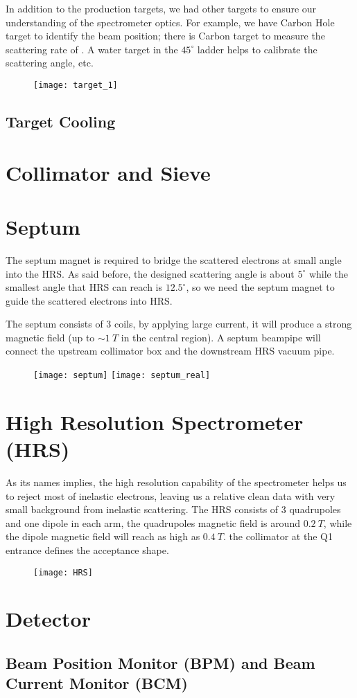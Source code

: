In addition to the production targets, we had other targets to ensure our 
understanding of the spectrometer optics. For example, we have Carbon Hole target
to identify the beam position; there is Carbon target to measure the scattering
rate of \C. A water target in the $45^\circ$ ladder helps to calibrate the 
scattering angle, etc.

\begin{figure}[h!]
    \centering
    \texttt{[image: target\_1]}
\end{figure}

\subsection{Target Cooling}

\section{Collimator and Sieve}

\section{Septum}
The septum magnet is required to bridge the scattered electrons at small angle
into the HRS. As said before, the designed scattering angle is about $5^\circ$
while the smallest angle that HRS can reach is $12.5^\circ$, so we need the septum
magnet to guide the scattered electrons into HRS. 

The septum consists of 3 coils, by applying large current, it will produce a
strong magnetic field (up to $\sim 1 \ T$ in the central region). A septum beampipe
will connect the upstream collimator box and the downstream HRS vacuum pipe.

\begin{figure}[h!]
    \texttt{[image: septum]}
    \texttt{[image: septum\_real]}
\end{figure}

\section{High Resolution Spectrometer (HRS)}
As its names implies, the high resolution capability of the spectrometer helps
us to reject most of inelastic electrons, leaving us a relative clean data with
very small background from inelastic scattering. The HRS consists of 3 quadrupoles 
and one dipole in each arm, the quadrupoles magnetic field is around $0.2 \ T$,
while the dipole magnetic field will reach as high as $0.4 \ T$.
the collimator at the Q1 entrance defines the acceptance shape.
\begin{figure}[h!]
    \centering
    \texttt{[image: HRS]}
\end{figure}

\section{Detector}

\subsection{Beam Position Monitor (BPM) and Beam Current Monitor (BCM)}
